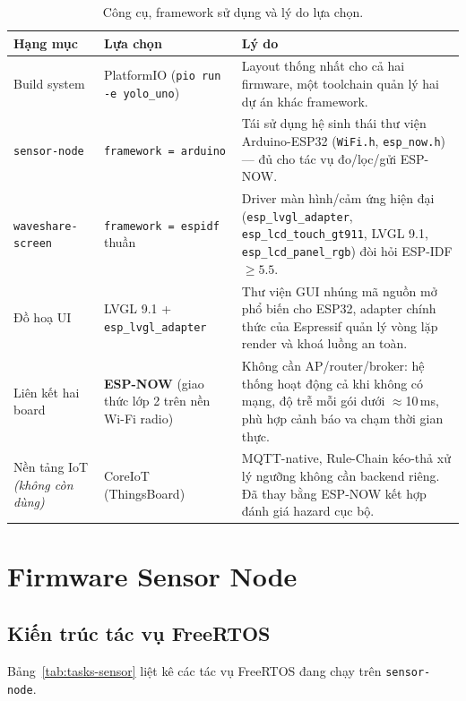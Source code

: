 \documentclass[a4paper,12pt]{article}
\newcommand{\code}[1]{\texttt{#1}}
\begin{document}
\begin{table}[H]
\centering
\small
\begin{tabular}{@{}p{3.0cm}p{4.4cm}p{6.5cm}@{}}
\toprule
\textbf{Hạng mục} & \textbf{Lựa chọn} & \textbf{Lý do} \\
\midrule
Build system & PlatformIO (\code{pio run -e yolo\_uno}) & Layout thống nhất cho cả hai firmware, một toolchain quản lý hai dự án khác framework. \\
\code{sensor-node} & \code{framework = arduino} & Tái sử dụng hệ sinh thái thư viện Arduino-ESP32 (\code{WiFi.h}, \code{esp\_now.h}) — đủ cho tác vụ đo/lọc/gửi ESP-NOW. \\
\code{waveshare-screen} & \code{framework = espidf} thuần & Driver màn hình/cảm ứng hiện đại (\code{esp\_lvgl\_adapter}, \code{esp\_lcd\_touch\_gt911}, LVGL 9.1, \code{esp\_lcd\_panel\_rgb}) đòi hỏi ESP-IDF $\geq 5.5$. \\
Đồ hoạ UI & LVGL 9.1 + \code{esp\_lvgl\_adapter} & Thư viện GUI nhúng mã nguồn mở phổ biến cho ESP32, adapter chính thức của Espressif quản lý vòng lặp render và khoá luồng an toàn. \\
Liên kết hai board & \textbf{ESP-NOW} (giao thức lớp 2 trên nền Wi-Fi radio) & Không cần AP/router/broker: hệ thống hoạt động cả khi không có mạng, độ trễ mỗi gói dưới $\approx$10\,ms, phù hợp cảnh báo va chạm thời gian thực. \\
Nền tảng IoT \emph{(không còn dùng)} & CoreIoT (ThingsBoard) & MQTT-native, Rule-Chain kéo-thả xử lý ngưỡng không cần backend riêng. Đã thay bằng ESP-NOW kết hợp đánh giá hazard cục bộ. \\
\bottomrule
\end{tabular}
\caption{Công cụ, framework sử dụng và lý do lựa chọn.}
\end{table}

\section{Firmware Sensor Node}

\subsection{Kiến trúc tác vụ FreeRTOS}

Bảng~\ref{tab:tasks-sensor} liệt kê các tác vụ FreeRTOS đang chạy trên \code{sensor-node}.
\end{document}
